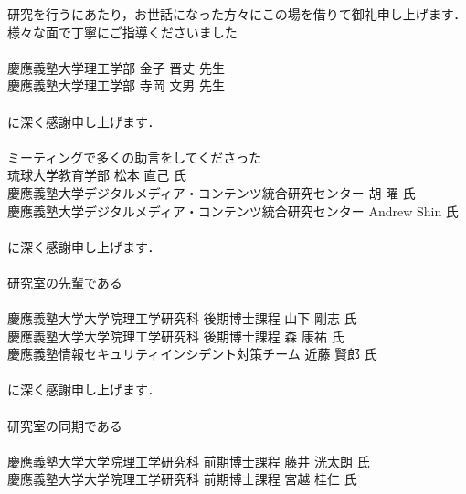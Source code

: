 {\small
	研究を行うにあたり，お世話になった方々にこの場を借りて御礼申し上げます．
	様々な面で丁寧にご指導くださいました\\
	\\
	{\hspace{1cm}慶應義塾大学理工学部 金子 晋丈  先生}\\
	{\hspace{1cm}慶應義塾大学理工学部 寺岡 文男  先生}\\
	\\
	に深く感謝申し上げます．\\
	\\
	ミーティングで多くの助言をしてくださった\\
	{\hspace{1cm}琉球大学教育学部 松本 直己 氏}\\
	{\hspace{1cm}慶應義塾大学デジタルメディア・コンテンツ統合研究センター 胡 曜 氏}\\
	{\hspace{1cm}慶應義塾大学デジタルメディア・コンテンツ統合研究センター Andrew Shin 氏}\\
	\\
	に深く感謝申し上げます．\\
  \\
  研究室の先輩である\\
  \\
  \hspace{1cm}慶應義塾大学大学院理工学研究科 後期博士課程 山下 剛志 氏\\
  \hspace{1cm}慶應義塾大学大学院理工学研究科 後期博士課程 森 康祐 氏 \\
  \hspace{1cm}慶應義塾情報セキュリティインシデント対策チーム 近藤 賢郎 氏 \\
	\\
  に深く感謝申し上げます．\\
  \\
	研究室の同期である\\
	\\
  \hspace{1cm}慶應義塾大学大学院理工学研究科 前期博士課程 藤井 洸太朗 氏 \\
  \hspace{1cm}慶應義塾大学大学院理工学研究科 前期博士課程 宮越 桂仁 氏 \\
}
